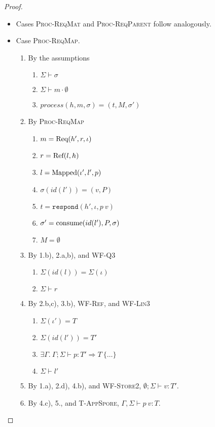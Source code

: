 \begin{proof}
\begin{itemize}
\item Cases \textsc{Proc-ReqMat} and \textsc{Proc-ReqParent} follow analogously.

\item Case \textsc{Proc-ReqMap}.
\begin{enumerate}
\item By the assumptions
  \begin{enumerate}[label=(\alph*)]
  \item $\Sigma \vdash \sigma$
  \item $\Sigma \vdash m \cdot \emptyset$
  \item $process(h, m, \sigma) = (t, M, \sigma')$
  \end{enumerate}
\item By \textsc{Proc-ReqMap}
  \begin{enumerate}[label=(\alph*)]
  \item $m = {\textrm{Req}(h', r, \iota)}$
  \item $r = {\textrm{Ref}(l, h)}$
  \item $l = {\textrm{Mapped}(\iota', l', p)}$
  \item $\sigma(id(l')) = (v, P)$
  \item $t = \texttt{respond}(h', \iota, p~v)$
  \item $\sigma' = {\textrm{consume}(id(l'), P, \sigma)}$
  \item $M = \emptyset$
  \end{enumerate}
\item By 1.b), 2.a,b), and \textsc{WF-Q3}
  \begin{enumerate}[label=(\alph*)]
  \item $\Sigma(id(l)) = \Sigma(\iota)$
  \item $\Sigma \vdash r$
  \end{enumerate}
\item By 2.b,c), 3.b), \textsc{WF-Ref}, and \textsc{WF-Lin3}
  \begin{enumerate}[label=(\alph*)]
  \item $\Sigma(\iota') = T$
  \item $\Sigma(id(l')) = T'$
  \item $\exists \Gamma.~\Gamma ; \Sigma \vdash p : T' \Rightarrow T~\{\ldots\}$
  \item $\Sigma \vdash l'$
  \end{enumerate}
\item By 1.a), 2.d), 4.b), and \textsc{WF-Store2}, $\emptyset ; \Sigma \vdash v : T'$.
\item By 4.c), 5., and \textsc{T-AppSpore}, $\Gamma, \Sigma \vdash p~v : T$.

\end{enumerate}
\end{itemize}
\end{proof}
